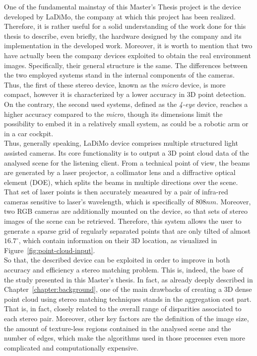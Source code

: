 One of the fundamental mainstay of this Master's Thesis project is the device developed by LaDiMo, the company at which this project has been realized.
Therefore, it is rather useful for a solid understanding of the work done for this thesis to describe, even briefly, the hardware designed by the company and its implementation in the developed work.
Moreover, it is worth to mention that two have actually been the company devices exploited to obtain the real environment images. 
Specifically, their general structure is the same. 
The differences between the two employed systems stand in the internal components of the cameras.
Thus, the first of these stereo device, known as the \textit{micro} device, is more compact, however it is characterized by a lower accuracy in 3D point detection.
On the contrary, the second used systems, defined as the \textit{4-eye} device, reaches a higher accuracy compared to the \textit{micro}, though its dimensions limit the possibility to embed it in a relatively small system, as could be a robotic arm or in a car cockpit.
\\
Thus, generally speaking, LaDiMo device comprises multiple structured light assisted cameras. 
Its core functionality is to output a 3D point cloud data of the analysed scene for the listening client. 
From a technical point of view, the beams are generated by a laser projector, a collimator lens and a diffractive optical element (DOE), which splits the beams in multiple directions over the scene.
That set of laser points is then accurately measured by a pair of infra-red cameras sensitive to laser's wavelength, which is specifically of $808 nm$.
Moreover, two RGB cameras are additionally mounted on the device, so that sets of stereo images of the scene can be retrieved.
Therefore, this system allows the user to generate a sparse grid of regularly separated points that are only tilted of almost $16.7^{\circ}$, which contain information on their 3D location, as visualized in Figure~\ref{fig:point-cloud-input}. \\
So that, the described device can be exploited in order to improve in both accuracy and efficiency a stereo matching problem.
This is, indeed, the base of the study presented in this Master's thesis. 
In fact, as already deeply described in Chapter~\ref{chapter:background}, one of the main drawbacks of creating a 3D dense point cloud using stereo matching techniques stands in the aggregation cost part. 
That is, in fact, closely related to the overall range of disparities associated to each stereo pair. 
Moreover, other key factors are the definition of the image size, the amount of texture-less regions contained in the analysed scene and the number of edges, which make the algorithms used in those processes even more complicated and computationally expensive. 
